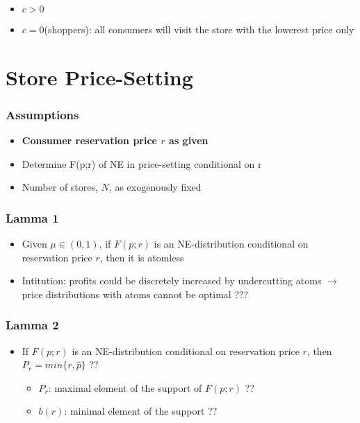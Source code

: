 \documentclass{beamer}
\begin{document}
\begin{frame}
\frametitle{}
\begin{itemize}
	\item $c>0$
	\item $c=0$(shoppers): all consumers will visit the store with the lowerest price only
\end{itemize}
\end{frame}


\section{Store Price-Setting}
\begin{frame}
\frametitle{Assumptions}
\begin{itemize}
	\item \textbf{Consumer reservation price $r$ as given}
	\item Determine F(p;r) of NE in price-setting conditional on r
	\item Number of stores, $N$, as exogenously fixed
\end{itemize}
\end{frame}

\begin{frame}
\frametitle{Lamma 1}
\begin{itemize}
	\item Given $\mu \in (0,1)$, if $F(p;r)$ is an NE-distribution conditional on reservation price $r$, then it is atomless\footnotemark
	\item Intitution: profits could be discretely increased by undercutting atoms $\to$ price distributions with atoms cannot be optimal ???
\end{itemize}
\end{frame}

\begin{frame}
\frametitle{Lamma 2}
\begin{itemize}
	\item If $F(p;r)$ is an NE-distribution conditional on reservation price $r$, then $P_r = min\{r,\hat{p}\}$ ??
	\begin{itemize}
		\item $P_r$: maximal element of the support of $F(p;r)$ ??
		\item $b(r)$: minimal element of the support ??
	\end{itemize}
\end{itemize}
\end{frame}
\end{document}
